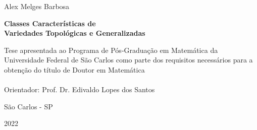 \documentclass[12pt,oneside]{book} %
\begin{document}





\newpage
\thispagestyle{empty} %

\begin{center}
  \small{Alex Melges Barbosa}
\end{center}
 \vspace{3cm}
\begin{center}
 \Large{\textbf{Classes Características de \\ Variedades Topológicas e Generalizadas}} %
\end{center}
 \vspace{2cm}
\begin{flushright}
 \begin{minipage}{0.5\textwidth}
  Tese apresentada ao Programa de Pós-Graduação em Matemática da Universidade Federal de São Carlos como parte dos requisitos necessários para a obtenção do título de Doutor em Matemática \\ \\ Orientador: Prof. Dr. Edivaldo Lopes dos Santos
 \end{minipage}
\end{flushright}
 \vspace{10cm}
\begin{center}
 São Carlos - SP
\end{center}
 \vspace{-0.8cm}
\begin{center}
 2022
\end{center}





\end{document}
